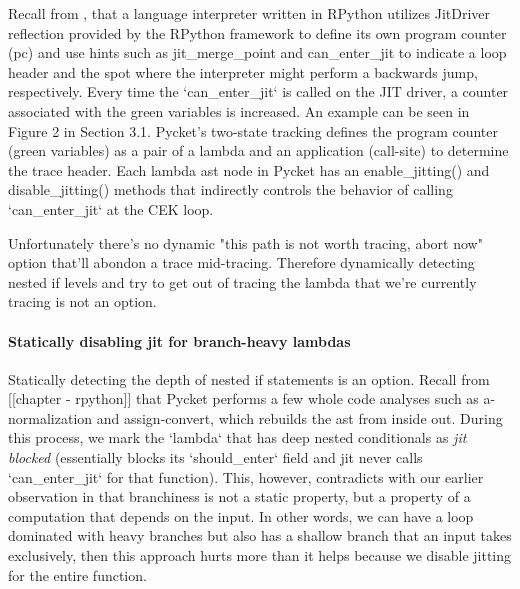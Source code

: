     \begin{paragraph-here}%
      Recall from , that a language interpreter written in RPython utilizes JitDriver reflection provided by the RPython framework to define its own program counter (pc) and use hints such as jit\_merge\_point and can\_enter\_jit to indicate a loop header and the spot where the interpreter might perform a backwards jump, respectively. Every time the `can\_enter\_jit` is called on the JIT driver, a counter associated with the green variables is increased. An example can be seen in Figure 2 in Section 3.1. Pycket’s two-state tracking defines the program counter (green variables) as a pair of a lambda and an application (call-site) to determine the trace header. Each lambda ast node in Pycket has an enable\_jitting() and disable\_jitting() methods that indirectly controls the behavior of calling `can\_enter\_jit` at the CEK loop.
    \end{paragraph-here}

    \begin{paragraph-here}%
      Unfortunately there's no dynamic "this path is not worth tracing, abort now" option that'll abondon a trace mid-tracing. Therefore dynamically detecting nested if levels and try to get out of tracing the lambda that we're currently tracing is not an option.
    \end{paragraph-here}

    \begin{paragraph-here}%
      \paragraph{Statically disabling jit for branch-heavy lambdas} Statically detecting the depth of nested if statements is an option. Recall from [[chapter - rpython]] that Pycket performs a few whole code analyses such as a-normalization and assign-convert, which rebuilds the ast from inside out. During this process, we mark the `lambda` that has deep nested conditionals as \emph{jit blocked} (essentially blocks its `should\_enter` field and jit never calls `can\_enter\_jit` for that function). This, however, contradicts with our earlier observation in  that branchiness is not a static property, but a property of a computation that depends on the input. In other words, we can have a loop dominated with heavy branches but also has a shallow branch that an input takes exclusively, then this approach hurts more than it helps because we disable jitting for the entire function.
    \end{paragraph-here}

